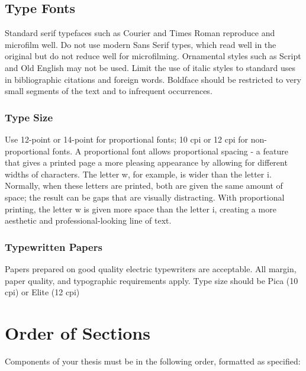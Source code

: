 \documentclass[draft]{ua-thesis}
\begin{document}
\section{Type Fonts}

Standard serif typefaces such as Courier and Times Roman reproduce and
microfilm well. Do not use modern Sans Serif types, which read well in the
original but do not reduce well for microfilming. Ornamental styles such as
Script and Old English may not be used. Limit the use of italic styles to
standard uses in bibliographic citations and foreign words. Boldface should
be restricted to very small segments of the text and to infrequent
occurrences.

\subsection{Type Size}

Use 12-point or 14-point for proportional fonts; 10 cpi or 12 cpi for
non-proportional fonts. A proportional font allows proportional spacing - a
feature that gives a printed page a more pleasing appearance by allowing for
different widths of characters. The letter w, for example, is wider than the
letter i. Normally, when these letters are printed, both are given the same
amount of space; the result can be gaps that are visually distracting. With
proportional printing, the letter w is given more space than the letter i,
creating a more aesthetic and professional-looking line of text.

\subsection{Typewritten Papers}

Papers prepared on good quality electric typewriters are acceptable. All
margin, paper quality, and typographic requirements apply. Type size should
be Pica (10 cpi) or Elite (12 cpi)


\chapter{Order of Sections}

Components of your thesis must be in the following order, formatted as
specified:
\end{document}
